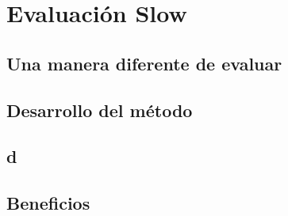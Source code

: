 \chapter{Evaluaci\'on Slow}
\section{Una manera diferente de evaluar}
\section{Desarrollo del método}
\section{d}
\section{Beneficios}